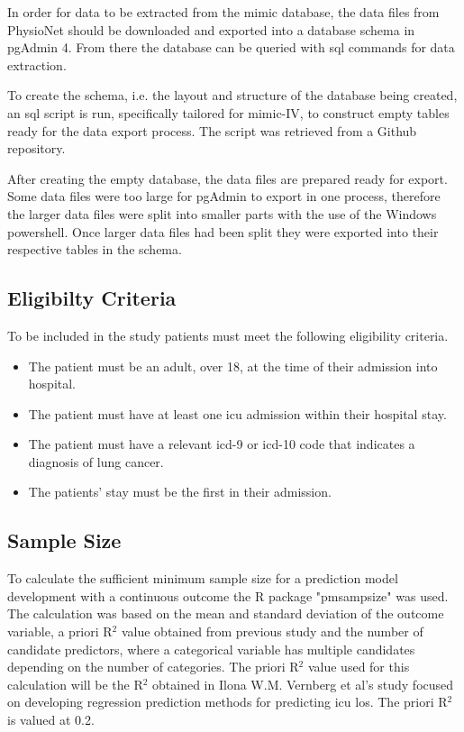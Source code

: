 \documentclass[11pt]{article}
\begin{document}
In order for data to be extracted from the \gls{mimic} database, the data files from PhysioNet should be downloaded and exported into a database schema in pgAdmin 4.  From there the database can be queried with \gls{sql}\cite{SQL} commands for data extraction.

To create the schema, i.e. the layout and structure of the database being created, an \gls{sql} script is run, specifically tailored for \gls{mimic}-IV, to construct empty tables ready for the data export process. The script was retrieved from a Github repository.\cite{SQLcode}

After creating the empty database, the data files are prepared ready for export. Some data files were too large for pgAdmin to export in one process, therefore the larger data files were split into smaller parts with the use of the Windows powershell. Once larger data files had been split they were exported into their respective tables in the schema.

\subsection{Eligibilty Criteria}

To be included in the study patients must meet the following eligibility criteria.
\begin{itemize}
\item The patient must be an adult, over 18, at the time of their admission into hospital.

\item The patient must have at least one \gls{icu} admission within their hospital stay.

\item The patient must have a relevant \gls{icd}-9 or \gls{icd}-10 code that indicates a diagnosis of lung cancer.

\item The patients' stay must be the first in their admission.
\end{itemize}

\subsection{Sample Size}

To calculate the sufficient minimum sample size for a prediction model development with a continuous outcome the R\cite{R} package "pmsampsize" was used. The calculation was based on the mean and standard deviation of the outcome variable, a priori R\(^2\) value obtained from previous study and the number of candidate predictors, where a categorical variable has multiple candidates depending on the number of categories. The priori R\(^2\) value used for this calculation will be the R\(^2\) obtained in Ilona W.M. Vernberg et al's study focused on developing regression prediction methods for predicting \gls{icu} \gls{los}\cite{Verburg2014}. The priori R\(^2\) is valued at 0.2.
\end{document}

